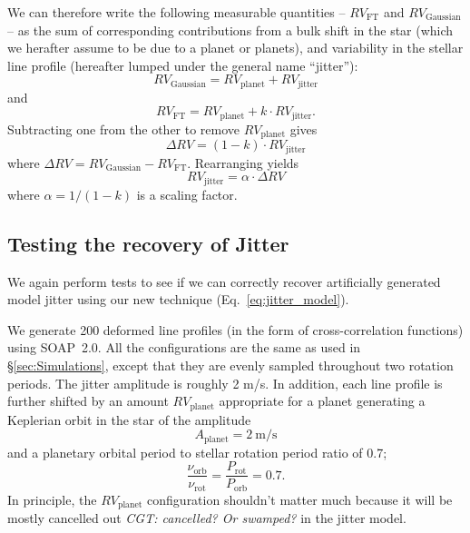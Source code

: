 We can therefore write the following measurable quantities -- $RV_\text{FT}$ and $RV_\text{Gaussian}$ --
as the sum of corresponding contributions from a bulk shift in the star (which
we herafter assume to be due to a planet or planets), and variability in the stellar line
profile (hereafter lumped under the general name ``jitter''):
\begin{equation}
	RV_\text{Gaussian} = RV_\text{planet} + RV_\text{jitter}
\label{eq:RV_Gaussian}
\end{equation}
and
\begin{equation}
	RV_\text{FT} = RV_\text{planet} + k \cdot RV_\text{jitter}. 
\label{eq:RV_FT}
\end{equation}
Subtracting one from the other to remove $RV_\text{planet}$ gives
\begin{equation}
	\Delta RV = (1-k) \cdot RV_\text{jitter}
\end{equation}
where $\Delta RV = RV_\text{Gaussian} - RV_\text{FT}$. Rearranging yields 
\begin{equation}
	RV_\text{jitter} = \alpha \cdot \Delta RV
\label{eq:jitter_model}
\end{equation}
where $\alpha = 1/(1-k)$ is a scaling factor.  


\subsection{Testing the recovery of Jitter}
\label{sec:check}

We again perform tests to see if we can correctly recover artificially generated model jitter
using our new technique (Eq.~\ref{eq:jitter_model}). 

We generate 200 deformed line profiles (in the form of cross-correlation functions) using SOAP~2.0.
All the configurations are the same as used in \S\ref{sec:Simulations}, except that they are evenly sampled throughout two
rotation periods. The jitter amplitude is roughly 2 m/s. 
In addition, each line profile is further shifted by an amount $RV_\text{planet}$ appropriate for
a planet generating a Keplerian orbit in the star of  the amplitude
\begin{equation*}
	A_\text{planet} = 2~\text{m/s}
\end{equation*}
and a planetary orbital period to stellar rotation period ratio of 0.7;
\begin{equation*}
	\frac{\nu_\text{orb}}{\nu_\text{rot}} = \frac{P_\text{rot}}{P_\text{orb}} = 0.7.
\end{equation*}
In principle, the $RV_\text{planet}$ configuration shouldn't matter much 
because it will be mostly cancelled out {\em CGT: cancelled? Or swamped?} in the jitter model. 

